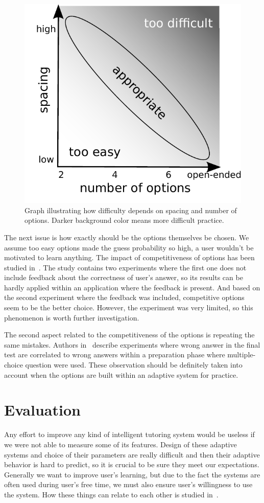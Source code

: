 \documentclass[table,color,cover,twoside,nolot,nolof]{fithesis3/fithesis3}
\begin{document}
\begin{figure}[h]
	\begin{center}
		\includegraphics[width=.5\textwidth]{figure/options_vs_spacing}
	\end{center}
	\caption{Graph illustrating how difficulty depends on spacing and number of
		options. Darker background color means more difficult practice.}
	\label{figure:options_vs_spacing}
\end{figure}

The next issue is how exactly should be the options themselves be chosen. We
assume too easy options made the guess probability so high, a user wouldn't be
motivated to learn anything. The impact of competitiveness of options has been
studied in~\cite{little2015optimizing}. The study contains two experiments
where the first one does not include feedback about the correctness of user's
answer, so its results can be hardly applied within an application where the
feedback is present. And based on the second experiment where the feedback was
included, competitive options seem to be the better choice. However, the
experiment was very limited, so this phenomenon is worth further investigation.

The second aspect related to the competitiveness of the options is repeating the
same mistakes. Authors in~\cite{marsh2007memorial} describe experiments where
wrong answer in the final test are correlated to wrong answers within a
preparation phase where multiple-choice question were used. These observation
should be definitely taken into account when the options are built within an
adaptive system for practice.

\section{Evaluation}
\label{section:evaluation}

Any effort to improve any kind of intelligent tutoring system would be useless
if we were not able to measure some of its features. Design of these
adaptive systems and choice of their parameters are really difficult and then
their adaptive behavior is hard to predict, so it is crucial to be sure they
meet our expectations. Generally we want to improve user's learning, but due to
the fact the systems are often used during user's free time, we must also
ensure user's willingness to use the system. How these things can relate to each
other is studied in~\cite{lomas2013optimizing}.
\end{document}
